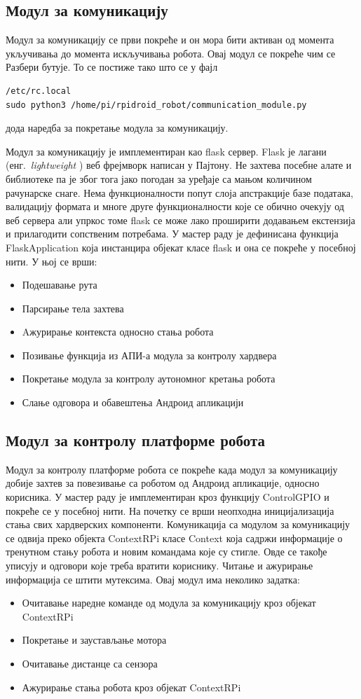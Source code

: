 \documentclass[12pt,oneside]{memoir}
\theoremstyle{remark}
\begin{document}
\subsection{Модул за комуникацију}
Модул за комуникацију се први покреће и он мора бити активан од момента укључивања до момента искључивања робота. Овај модул се покреће чим се Разбери бутује. То се постиже тако што се у фајл 
\begin{lstlisting}
/etc/rc.local
sudo python3 /home/pi/rpidroid_robot/communication_module.py
\end{lstlisting}
дода наредба за покретање модула за комуникацију.

Модул за комуникацију је имплементиран као flask сервер. Flask је лагани  (енг.~{\em light\-weight }) веб фрејмворк написан у Пајтону. Не захтева посебне алате и библиотеке па је због тога јако погодан за уређаје са мањом количином рачунарске снаге. Нема функционалности попут слоја апстракције базе података, валидацију формата и многе друге функционалности које се обично очекују од веб сервера али упркос томе flask се може лако проширити додавањем екстензија и прилагодити сопственим потребама.
У мастер раду је дефинисана функција FlaskApplication која инстанцира објекат класе flask и она се покреће у посебној нити.  У њој се врши:
\begin{itemize}
\item Подешавање рута
\item Парсирање тела захтева 
\item Aжурирање контекста односно стања робота
\item Позивање функција из АПИ-а модула за контролу хардвера
\item Покретање модула за контролу аутономног кретања робота
\item Слање одговора и обавештења Андроид апликацији
\end{itemize}

\subsection{Модул за контролу платформе робота}
Модул за контролу платформе робота се покреће када модул за комуникацију добије захтев за повезивање са роботом од Андроид апликације, односно корисника. 
У мастер раду је имплементиран кроз функцију ControlGPIO и покреће се у посебној нити. На почетку се врши неопходна иницијализација стања свих хардверских компоненти. Комуникација са модулом за комуникацију се одвија преко објекта ContextRPi  класе Context која садржи информације о тренутном стању робота и новим командама које су стигле. Овде се такође уписују и одговори које треба вратити кориснику. Читање и ажурирање информација се штити мутексима.
Овај модул има неколико задатка:
\begin{itemize}
\item Очитавање наредне команде од модула за комуникацију кроз објекат ContextRPi
\item Покретање и заустављање мотора
\item Очитавање дистанце са сензора
\item Ажурирање стања робота кроз објекат ContextRPi
\end{itemize}
\end{document}
